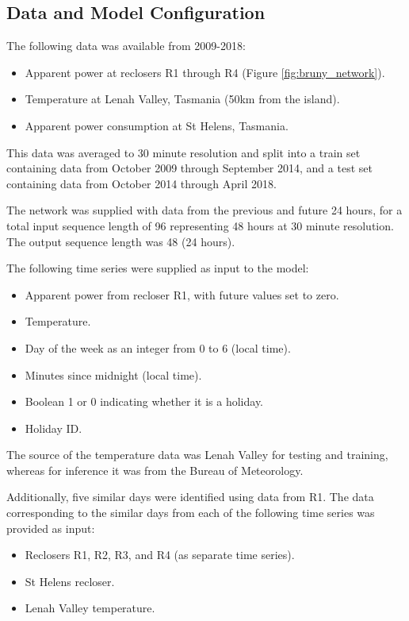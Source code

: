\documentclass[conference]{IEEEtran}
\begin{document}
\subsection{Data and  Model Configuration}
The following data was available from 2009-2018:
\begin{itemize}
	\item Apparent power at reclosers R1 through R4 (Figure \ref{fig:bruny_network}).
	\item Temperature at Lenah Valley, Tasmania (50km from the island). 
	\item Apparent power consumption at St Helens, Tasmania.
\end{itemize}

This data was averaged to 30 minute resolution and split into a train set containing data from October 2009 through September 2014, and a test set containing data from October 2014 through April 2018.

The network was supplied with data from the previous and future 24 hours, for a total input sequence length of 96 representing 48 hours at 30 minute resolution.
The output sequence length was 48 (24 hours).

The following time series were supplied as input to the model:
\begin{itemize}
	\item Apparent power from recloser R1, with future values set to zero.
	\item Temperature.
	\item Day of the week as an integer from 0 to 6 (local time).
	\item Minutes since midnight (local time).
	\item Boolean 1 or 0 indicating whether it is a holiday.
	\item Holiday ID.
\end{itemize}

The source of the temperature data was Lenah Valley for testing and training, whereas for inference it was from the Bureau of Meteorology.

Additionally, five similar days were identified using data from R1.
The data corresponding to the similar days from each of the following time series was provided as input:
\begin{itemize}
	\item Reclosers R1, R2, R3, and R4 (as separate time series).
	\item St Helens recloser.
	\item Lenah Valley temperature.
\end{itemize}
\end{document}
